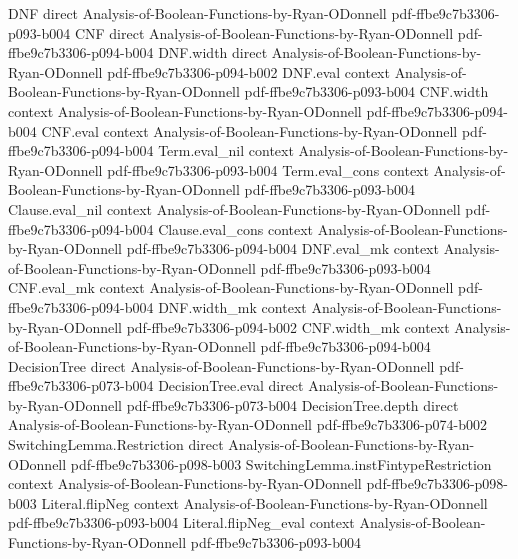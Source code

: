 \begin{lemma}
\proofstep
  {DNF}
  {direct}
  {Analysis-of-Boolean-Functions-by-Ryan-ODonnell}
  {pdf-ffbe9c7b3306-p093-b004}
\proofstep
  {CNF}
  {direct}
  {Analysis-of-Boolean-Functions-by-Ryan-ODonnell}
  {pdf-ffbe9c7b3306-p094-b004}
\proofstep
  {DNF.width}
  {direct}
  {Analysis-of-Boolean-Functions-by-Ryan-ODonnell}
  {pdf-ffbe9c7b3306-p094-b002}
\proofstep
  {DNF.eval}
  {context}
  {Analysis-of-Boolean-Functions-by-Ryan-ODonnell}
  {pdf-ffbe9c7b3306-p093-b004}
\proofstep
  {CNF.width}
  {context}
  {Analysis-of-Boolean-Functions-by-Ryan-ODonnell}
  {pdf-ffbe9c7b3306-p094-b004}
\proofstep
  {CNF.eval}
  {context}
  {Analysis-of-Boolean-Functions-by-Ryan-ODonnell}
  {pdf-ffbe9c7b3306-p094-b004}
\proofstep
  {Term.eval_nil}
  {context}
  {Analysis-of-Boolean-Functions-by-Ryan-ODonnell}
  {pdf-ffbe9c7b3306-p093-b004}
\proofstep
  {Term.eval_cons}
  {context}
  {Analysis-of-Boolean-Functions-by-Ryan-ODonnell}
  {pdf-ffbe9c7b3306-p093-b004}
\proofstep
  {Clause.eval_nil}
  {context}
  {Analysis-of-Boolean-Functions-by-Ryan-ODonnell}
  {pdf-ffbe9c7b3306-p094-b004}
\proofstep
  {Clause.eval_cons}
  {context}
  {Analysis-of-Boolean-Functions-by-Ryan-ODonnell}
  {pdf-ffbe9c7b3306-p094-b004}
\proofstep
  {DNF.eval_mk}
  {context}
  {Analysis-of-Boolean-Functions-by-Ryan-ODonnell}
  {pdf-ffbe9c7b3306-p093-b004}
\proofstep
  {CNF.eval_mk}
  {context}
  {Analysis-of-Boolean-Functions-by-Ryan-ODonnell}
  {pdf-ffbe9c7b3306-p094-b004}
\proofstep
  {DNF.width_mk}
  {context}
  {Analysis-of-Boolean-Functions-by-Ryan-ODonnell}
  {pdf-ffbe9c7b3306-p094-b002}
\proofstep
  {CNF.width_mk}
  {context}
  {Analysis-of-Boolean-Functions-by-Ryan-ODonnell}
  {pdf-ffbe9c7b3306-p094-b004}
\proofstep
  {DecisionTree}
  {direct}
  {Analysis-of-Boolean-Functions-by-Ryan-ODonnell}
  {pdf-ffbe9c7b3306-p073-b004}
\proofstep
  {DecisionTree.eval}
  {direct}
  {Analysis-of-Boolean-Functions-by-Ryan-ODonnell}
  {pdf-ffbe9c7b3306-p073-b004}
\proofstep
  {DecisionTree.depth}
  {direct}
  {Analysis-of-Boolean-Functions-by-Ryan-ODonnell}
  {pdf-ffbe9c7b3306-p074-b002}
\proofstep
  {SwitchingLemma.Restriction}
  {direct}
  {Analysis-of-Boolean-Functions-by-Ryan-ODonnell}
  {pdf-ffbe9c7b3306-p098-b003}
\proofstep
  {SwitchingLemma.instFintypeRestriction}
  {context}
  {Analysis-of-Boolean-Functions-by-Ryan-ODonnell}
  {pdf-ffbe9c7b3306-p098-b003}
\proofstep
  {Literal.flipNeg}
  {context}
  {Analysis-of-Boolean-Functions-by-Ryan-ODonnell}
  {pdf-ffbe9c7b3306-p093-b004}
\proofstep
  {Literal.flipNeg_eval}
  {context}
  {Analysis-of-Boolean-Functions-by-Ryan-ODonnell}
  {pdf-ffbe9c7b3306-p093-b004}
\proofstep

\end{lemma}
